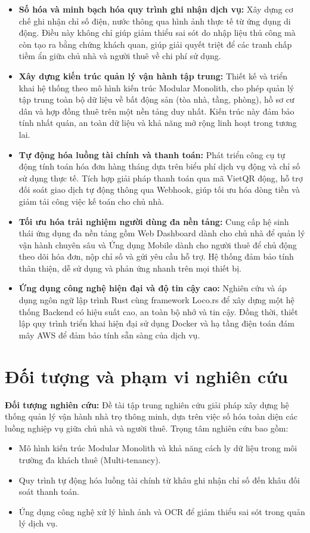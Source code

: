 \begin{itemize}
    \item \textbf{Số hóa và minh bạch hóa quy trình ghi nhận dịch vụ:}
    Xây dựng cơ chế ghi nhận chỉ số điện, nước thông qua hình ảnh thực tế từ ứng dụng di động. Điều này không chỉ giúp giảm thiểu sai sót do nhập liệu thủ công mà còn tạo ra bằng chứng khách quan, giúp giải quyết triệt để các tranh chấp tiềm ẩn giữa chủ nhà và người thuê về chi phí sử dụng.

    \item \textbf{Xây dựng kiến trúc quản lý vận hành tập trung:}
    Thiết kế và triển khai hệ thống theo mô hình kiến trúc Modular Monolith, cho phép quản lý tập trung toàn bộ dữ liệu về bất động sản (tòa nhà, tầng, phòng), hồ sơ cư dân và hợp đồng thuê trên một nền tảng duy nhất. Kiến trúc này đảm bảo tính nhất quán, an toàn dữ liệu và khả năng mở rộng linh hoạt trong tương lai.

    \item \textbf{Tự động hóa luồng tài chính và thanh toán:}
    Phát triển công cụ tự động tính toán hóa đơn hàng tháng dựa trên biểu phí dịch vụ động và chỉ số sử dụng thực tế. Tích hợp giải pháp thanh toán qua mã VietQR động, hỗ trợ đối soát giao dịch tự động thông qua Webhook, giúp tối ưu hóa dòng tiền và giảm tải công việc kế toán cho chủ nhà.

    \item \textbf{Tối ưu hóa trải nghiệm người dùng đa nền tảng:}
    Cung cấp hệ sinh thái ứng dụng đa nền tảng gồm Web Dashboard dành cho chủ nhà để quản lý vận hành chuyên sâu và Ứng dụng Mobile dành cho người thuê để chủ động theo dõi hóa đơn, nộp chỉ số và gửi yêu cầu hỗ trợ. Hệ thống đảm bảo tính thân thiện, dễ sử dụng và phản ứng nhanh trên mọi thiết bị.

    \item \textbf{Ứng dụng công nghệ hiện đại và độ tin cậy cao:}
    Nghiên cứu và áp dụng ngôn ngữ lập trình Rust cùng framework Loco.rs để xây dựng một hệ thống Backend có hiệu suất cao, an toàn bộ nhớ và tin cậy. Đồng thời, thiết lập quy trình triển khai hiện đại sử dụng Docker và hạ tầng điện toán đám mây AWS để đảm bảo tính sẵn sàng của dịch vụ.
\end{itemize}

\section{Đối tượng và phạm vi nghiên cứu}

\textbf{Đối tượng nghiên cứu:}
Đề tài tập trung nghiên cứu giải pháp xây dựng hệ thống quản lý vận hành nhà trọ thông minh, dựa trên việc số hóa toàn diện các luồng nghiệp vụ giữa chủ nhà và người thuê. Trọng tâm nghiên cứu bao gồm:
\begin{itemize}
    \item Mô hình kiến trúc Modular Monolith và khả năng cách ly dữ liệu trong môi trường đa khách thuê (Multi-tenancy).
    \item Quy trình tự động hóa luồng tài chính từ khâu ghi nhận chỉ số đến khâu đối soát thanh toán.
    \item Ứng dụng công nghệ xử lý hình ảnh và OCR để giảm thiểu sai sót trong quản lý dịch vụ.
\end{itemize}

